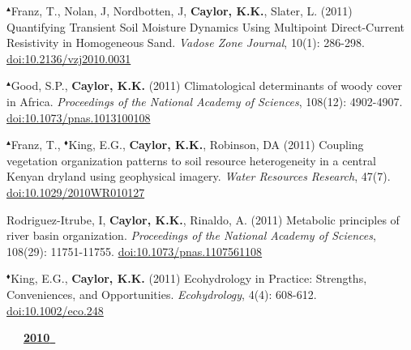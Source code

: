 \begin{etaremune}
\item $^{\blacktriangle}$Franz, T., Nolan, J, Nordbotten, J, \textbf{ Caylor, K.K.}, Slater, L. (2011) Quantifying Transient Soil Moisture Dynamics Using Multipoint Direct-Current Resistivity in Homogeneous Sand. \emph{Vadose Zone Journal}, 10(1): 286-298. \href{https://doi.org/10.2136/vzj2010.0031}{doi:10.2136/vzj2010.0031}
\item $^{\blacktriangle}$Good, S.P., \textbf{ Caylor, K.K.} (2011) Climatological determinants of woody cover in Africa. \emph{Proceedings of the National Academy of Sciences}, 108(12): 4902-4907. \href{https://doi.org/10.1073/pnas.1013100108}{doi:10.1073/pnas.1013100108}
\item $^{\blacktriangle}$Franz, T., $^{\blacklozenge}$King, E.G., \textbf{ Caylor, K.K.}, Robinson, DA (2011) Coupling vegetation organization patterns to soil resource heterogeneity in a central Kenyan dryland using geophysical imagery. \emph{Water Resources Research}, 47(7). \href{https://doi.org/10.1029/2010WR010127}{doi:10.1029/2010WR010127}
\item Rodriguez-Itrube, I, \textbf{ Caylor, K.K.}, Rinaldo, A. (2011) Metabolic principles of river basin organization. \emph{Proceedings of the National Academy of Sciences}, 108(29): 11751-11755. \href{https://doi.org/10.1073/pnas.1107561108}{doi:10.1073/pnas.1107561108}
\item $^{\blacklozenge}$King, E.G., \textbf{ Caylor, K.K.} (2011) Ecohydrology in Practice: Strengths, Conveniences, and Opportunities. \emph{Ecohydrology}, 4(4): 608-612. \href{https://doi.org/10.1002/eco.248}{doi:10.1002/eco.248}

\vspace{0.1in}
\mbox{\ \ \ \underline{\textbf{2010 }}}
\vspace{0.1in}


\end{etaremune}
